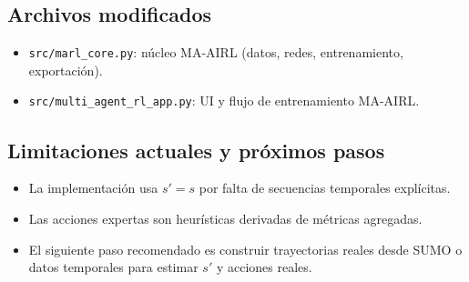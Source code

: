 \subsection{Archivos modificados}
\begin{itemize}
\item \texttt{src/marl\_core.py}: núcleo MA-AIRL (datos, redes, entrenamiento, exportación).
\item \texttt{src/multi\_agent\_rl\_app.py}: UI y flujo de entrenamiento MA-AIRL.
\end{itemize}

\subsection{Limitaciones actuales y próximos pasos}
\begin{itemize}
\item La implementación usa $s'=s$ por falta de secuencias temporales explícitas.
\item Las acciones expertas son heurísticas derivadas de métricas agregadas.
\item El siguiente paso recomendado es construir trayectorias reales desde SUMO o datos temporales para estimar $s'$ y acciones reales.
\end{itemize}

